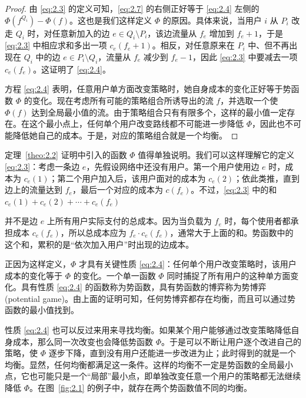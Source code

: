 \begin{proof}
由 \eqref{eq:2.3} 的定义可知，\eqref{eq:2.7} 的右侧正好等于 \eqref{eq:2.4} 左侧的 \(\Phi \left( {f}^{{Q}_{i}}\right)  - \Phi \left( f\right)\)。这也是我们这样定义 \(\Phi\) 的原因。具体来说，当用户 \(i\) 从 \({P}_{i}\) 改走 \({Q}_{i}\) 时，对任意新加入的边 \(e \in {Q}_{i} \setminus {P}_{i}\)，该边流量从 \({f}_{e}\) 增加到 \({f}_{e}+1\)，于是 \eqref{eq:2.3} 中相应求和多出一项 \({c}_{e}\left( {{f}_{e} + 1}\right)\)。相反，对任意原来在 \({P}_{i}\) 中、但不再出现在 \({Q}_{i}\) 中的边 \(e \in {P}_{i} \setminus {Q}_{i}\)，流量从 \({f}_{e}\) 减少到 \({f}_{e}-1\)，因此 \eqref{eq:2.3} 中要减去一项 \({c}_{e}\left( {f}_{e}\right)\)。这证明了 \eqref{eq:2.4}。

方程 \eqref{eq:2.4} 表明，任意用户单方面改变策略时，她自身成本的变化正好等于势函数 \(\Phi\) 的变化。现在考虑所有可能的策略组合所诱导出的流 \(f\)，并选取一个使 \(\Phi \left( f\right)\) 达到全局最小值的流。由于策略组合只有有限多个，这样的最小值一定存在。在这个最小点上，任何单个用户改变路线都不可能进一步降低 \(\Phi\)，因此也不可能降低她自己的成本。于是，对应的策略组合就是一个均衡。\end{proof}

定理~\ref{theo:2.2} 证明中引入的函数 \(\Phi\) 值得单独说明。我们可以这样理解它的定义 \eqref{eq:2.3}：考虑一条边 \(e\)，先假设网络中还没有用户。第一个用户使用边 \(e\) 时，成本为 \(c_e\left( 1\right)\)；第二个用户加入后，该用户面对的成本为 \(c_e\left( 2\right)\)；依此类推，直到边上的流量达到 \({f}_{e}\)，最后一个对应的成本为 \(c\left( {f}_{e}\right)\)。不过，\eqref{eq:2.3} 中的和 ${c}_{e}\left( 1\right)  + {c}_{e}\left( 2\right)  + \cdots  + {c}_{e}\left( {f}_{e}\right)$

并不是边 \(e\) 上所有用户实际支付的总成本。因为当负载为 \({f}_{e}\) 时，每个使用者都承担成本 \(c_e\left( {f}_{e}\right)\)，所以总成本应为 \({f}_{e} \cdot c_e\left( {f}_{e}\right)\)，通常大于上面的和。势函数中的这个和，累积的是“依次加入用户”时出现的边成本。

正因为这样定义，\(\Phi\) 才具有关键性质 \eqref{eq:2.4}：任何单个用户改变策略时，该用户成本的变化等于 \(\Phi\) 的变化。一个单一函数 \(\Phi\) 同时捕捉了所有用户的这种单方面变化。具有性质 \eqref{eq:2.4} 的函数称为势函数，具有势函数的博弈称为势博弈(potential game)。由上面的证明可知，任何势博弈都存在均衡，而且可以通过势函数的最小值找到。

性质 \eqref{eq:2.4} 也可以反过来用来寻找均衡。如果某个用户能够通过改变策略降低自身成本，那么同一次改变也会降低势函数 \(\Phi\)。于是可以不断让用户逐个改进自己的策略，使 \(\Phi\) 逐步下降，直到没有用户还能进一步改进为止；此时得到的就是一个均衡。显然，任何均衡都满足这一条件。这样的均衡不一定是势函数的全局最小点，它也可能只是一个“局部”最小点，即单独改变任意一个用户的策略都无法继续降低 \(\Phi\)。在图~\ref{fig:2.1} 的例子中，就存在两个势函数值不同的均衡。

